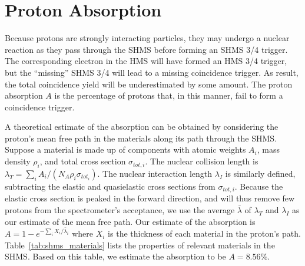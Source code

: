 \section{Proton Absorption}

Because protons are strongly interacting particles, they may undergo a nuclear
reaction as they pass through the SHMS before forming an SHMS 3/4 trigger.
The corresponding electron in the HMS will have formed an HMS 3/4 trigger, but
the ``missing'' SHMS 3/4 will lead to a missing coincidence trigger.
As result, the total coincidence yield will be underestimated by some amount.
The proton absorption $A$ is the percentage of protons that, in this manner,
fail to form a coincidence trigger.


A theoretical estimate of the absorption can be obtained by considering the
proton's mean free path in the materials along its path through the SHMS.
Suppose a material is made up of components with atomic weights $A_i$, mass
density $\rho_i$, and total cross section $\sigma_{tot,i}$.
The nuclear collision length is
$\lambda_{T} = \sum_i A_i / (N_A \rho_i \sigma_{tot_i})$.
The nuclear interaction length $\lambda_{I}$ is similarly defined, subtracting
the elastic and quasielastic cross sections from $\sigma_{tot,i}$.
Because the elastic cross section is peaked in the forward direction, and will
thus remove few protons from the spectrometer's acceptance, we use the average
$\bar\lambda$ of $\lambda_T$ and $\lambda_I$ as our estimate of the mean free
path.
Our estimate of the absorption is $A=1-e^{-\sum_i X_i/\bar\lambda_i}$ where
$X_i$ is the thickness of each material in the proton's path.
Table~\ref{tab:shms_materials} lists the properties of relevant materials in
the SHMS.
Based on this table, we estimate the absorption to be $A=8.56\%$.


